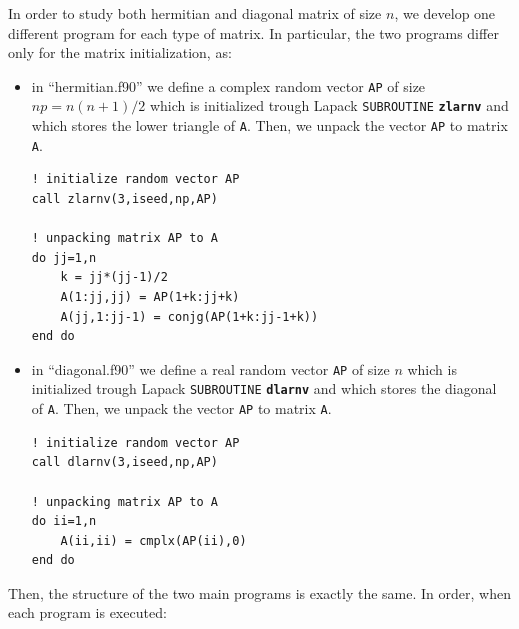 \documentclass[rmp,10pt,onecolumn,fleqn,notitlepage]{revtex4-1}
\begin{document}
In order to study both hermitian and diagonal matrix of size \( n \), we develop one different program for each type of matrix. In particular, the two programs differ only for the matrix initialization, as:
\begin{itemize}
\item in “hermitian.f90” we define a complex random vector \texttt{AP} of size \( np = n (n+1)/2 \) which is initialized trough Lapack \texttt{SUBROUTINE} {\bfseries\texttt{zlarnv}} and which stores the lower triangle of \texttt{A}. Then, we unpack the vector \texttt{AP} to matrix \texttt{A}.

\begin{minipage}[t]{0.4\linewidth}%
\begin{lstlisting}[style=Fortran]
! initialize random vector AP
call zlarnv(3,iseed,np,AP)

! unpacking matrix AP to A
do jj=1,n
    k = jj*(jj-1)/2
    A(1:jj,jj) = AP(1+k:jj+k)
    A(jj,1:jj-1) = conjg(AP(1+k:jj-1+k))
end do\end{lstlisting}
\end{minipage}


\item in “diagonal.f90” we define a real random vector \texttt{AP} of size \( n \) which is initialized trough Lapack \texttt{SUBROUTINE} {\bfseries\texttt{dlarnv}} and which stores the diagonal of \texttt{A}. Then, we unpack the vector \texttt{AP} to matrix \texttt{A}.

\begin{minipage}[t]{0.4\linewidth}%
\begin{lstlisting}[style=Fortran]
! initialize random vector AP
call dlarnv(3,iseed,np,AP)

! unpacking matrix AP to A
do ii=1,n
    A(ii,ii) = cmplx(AP(ii),0)
end do\end{lstlisting}
\end{minipage}

\end{itemize}
Then, the structure of the two main programs is exactly the same. In order, when each program is executed:
\end{document}
